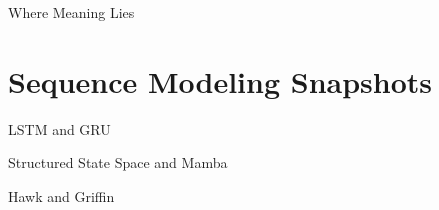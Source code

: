 


\begin{slide}[\slideopts,toc={Hypersphere}]{Where Meaning Lies}
\vspace{-1em}
\end{slide}

\section[\sectopts,toc={History Samples}]{Sequence Modeling Snapshots}

\begin{slidewhite}[\slideopts, toc={LSTM \& GRU}]{LSTM and GRU}
\vspace{-6em}
\end{slidewhite}

\begin{slidewhite}[\slideopts, toc={SSM \& Mamba}]{Structured State Space and Mamba}
\vspace{-6em}
\end{slidewhite}

\begin{slidewhite}[\slideopts,toc={Hawk \& Griffin}]{Hawk and Griffin}
\vspace{-6em}
\end{slidewhite}

